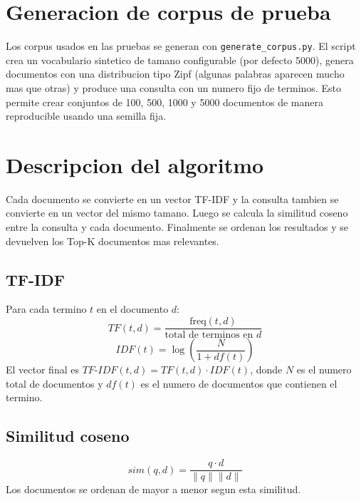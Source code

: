 \documentclass[11pt]{article}
\begin{document}
\section{Generacion de corpus de prueba}
Los corpus usados en las pruebas se generan con \texttt{generate\_corpus.py}.
El script crea un vocabulario sintetico de tamano configurable (por defecto 5000),
genera documentos con una distribucion tipo Zipf (algunas palabras aparecen
mucho mas que otras) y produce una consulta con un numero fijo de terminos.
Esto permite crear conjuntos de 100, 500, 1000 y 5000 documentos de manera
reproducible usando una semilla fija.

\section{Descripcion del algoritmo}
Cada documento se convierte en un vector TF-IDF y la consulta tambien se
convierte en un vector del mismo tamano. Luego se calcula la similitud coseno
entre la consulta y cada documento. Finalmente se ordenan los resultados y se
devuelven los Top-K documentos mas relevantes.

\subsection{TF-IDF}
Para cada termino $t$ en el documento $d$:
\[
  TF(t,d) = \frac{\text{freq}(t,d)}{\text{total de terminos en } d}
\]
\[
  IDF(t) = \log \left(\frac{N}{1 + df(t)}\right)
\]
El vector final es $TF\mbox{-}IDF(t,d)=TF(t,d)\cdot IDF(t)$, donde $N$ es el
numero total de documentos y $df(t)$ es el numero de documentos que contienen
el termino.

\subsection{Similitud coseno}
\[
  sim(q,d) = \frac{q \cdot d}{\|q\|\|d\|}
\]
Los documentos se ordenan de mayor a menor segun esta similitud.
\end{document}
